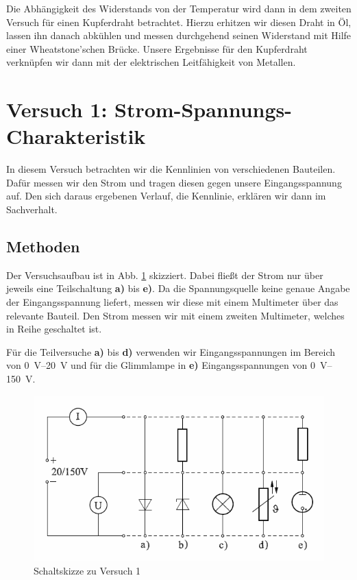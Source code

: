 \documentclass[11pt,a4paper,titlepage, ngerman]{article}
\begin{document}
		Die Abhängigkeit des Widerstands von der Temperatur wird dann in dem zweiten Versuch für einen Kupferdraht betrachtet.
		Hierzu erhitzen wir diesen Draht in Öl, lassen ihn danach abkühlen und messen durchgehend seinen Widerstand mit Hilfe einer Wheatstone'schen Brücke. Unsere Ergebnisse für den Kupferdraht verknüpfen wir dann mit der elektrischen Leitfähigkeit von Metallen.

	\section{Versuch 1: Strom-Spannungs-Charakteristik}
		
		In diesem Versuch betrachten wir die Kennlinien von verschiedenen Bauteilen. Dafür messen wir den Strom und tragen diesen gegen unsere Eingangsspannung auf. Den sich daraus ergebenen Verlauf, die Kennlinie, erklären wir dann im Sachverhalt. 
		
		\subsection{Methoden} 
		
		Der Versuchsaufbau ist in Abb. \ref{Schaltskizze1} skizziert. Dabei fließt der Strom nur über jeweils eine Teilschaltung \textbf{a)} bis \textbf{e)}. 
		Da die Spannungsquelle keine genaue Angabe der Eingangsspannung liefert, messen wir diese mit einem Multimeter über das relevante Bauteil.
		Den Strom messen wir mit einem zweiten Multimeter, welches in Reihe geschaltet ist.
		
		Für die Teilversuche \textbf{a)} bis \textbf{d)} verwenden wir Eingangsspannungen im Bereich von \SIrange{0}{20}{\V} und für die Glimmlampe in \textbf{e)} Eingangsspannungen von \SIrange{0}{150}{\V}.
		
		\begin{figure}
			\includegraphics[width=\textwidth]{Versuch1.png}
			\caption{Schaltskizze zu Versuch 1}
			\label{Schaltskizze1}
		\end{figure}
\end{document}
